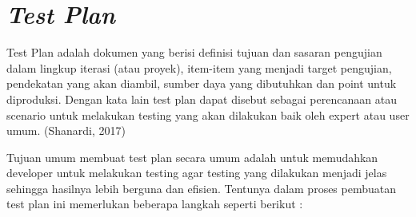 \section {\textit{Test Plan}}
\par Test Plan adalah dokumen yang berisi definisi tujuan dan sasaran pengujian dalam lingkup iterasi (atau proyek), item-item yang menjadi target pengujian, pendekatan yang akan diambil, sumber daya yang dibutuhkan dan point untuk diproduksi. Dengan kata lain test plan dapat disebut sebagai perencanaan atau scenario untuk melakukan testing yang akan dilakukan baik oleh expert atau user umum. (Shanardi, 2017)
\par Tujuan umum membuat test plan secara umum adalah untuk memudahkan developer untuk melakukan testing agar testing yang dilakukan menjadi jelas sehingga hasilnya lebih berguna dan efisien. Tentunya dalam proses pembuatan test plan ini memerlukan beberapa langkah seperti berikut :
